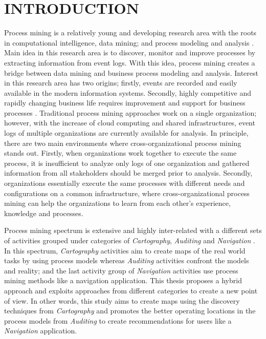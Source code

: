 \chapter{INTRODUCTION}
\label{chp:introduction}

Process mining is a relatively young and developing research area with the roots in computational intelligence, data mining; and process modeling and analysis \cite{van2012process}. Main idea in this research area is to discover, monitor and improve processes by extracting information from event logs. With this idea, process mining creates a bridge between data mining and business process modeling and analysis. Interest in this research area has two origins; firstly, events are recorded and easily available in the modern information systems. Secondly, highly competitive and rapidly changing business life requires improvement and support for business processes \cite{van2012process}. Traditional process mining approaches work on a single organization; however, with the increase of cloud computing and shared infrastructures, event logs of multiple organizations are currently available for analysis. In principle, there are two main environments where cross-organizational process mining stands out. Firstly, when organizations work together to execute the same process, it is insufficient to analyze only logs of one organization and gathered information from all stakeholders should be merged prior to analysis. Secondly, organizations essentially execute the same processes with different needs and configurations on a common infrastructure, where cross-organizational process mining can help the organizations to learn from each other's experience, knowledge and processes.

Process mining spectrum is extensive and highly inter-related with a different sets of activities grouped under categories of \textit{Cartography}, \textit{Auditing} and \textit{Navigation} \cite{van2011process}. In this spectrum, \textit{Cartography} activities aim to create maps of the real world tasks by using process models whereas \textit{Auditing} activities confront the models and reality; and the last activity group of \textit{Navigation} activities use process mining methods like a navigation application. This thesis proposes a hybrid approach and exploits approaches from different categories to create a new point of view. In other words, this study aims to create maps using the discovery techniques from \textit{Cartography} and promotes the better operating locations in the process models from \textit{Auditing} to create recommendations for users like a \textit{Navigation} application. 

